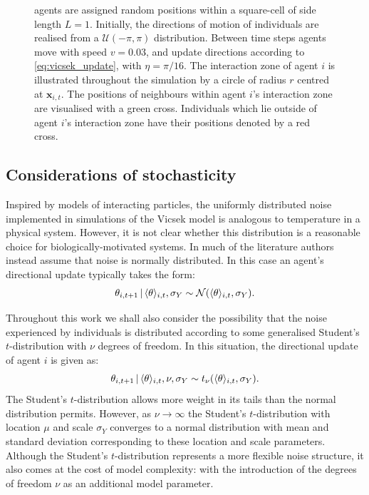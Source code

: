 \begin{figure}[tb]
{        agents are assigned random positions within a square-cell of side length $L=1$.
        Initially, the directions of motion of individuals are realised from a
        $\mathcal{U}(-\pi, \pi)$ distribution. Between time steps agents move with speed
        $v=0.03$, and update directions according to \cref{eq:vicsek_update}, with
        $\eta=\pi/16$. The interaction zone of agent $i$ is illustrated throughout the
        simulation by a circle of radius $r$ centred at $\bm{x}_{i,t}$. The positions of
        neighbours within agent $i$'s interaction zone are visualised with a green cross.
        Individuals which lie outside of agent $i$'s interaction zone have their positions
        denoted by a red cross.}
        \label{fig:vicsek_sim}
\end{figure}

\subsection{Considerations of stochasticity}

Inspired by models of interacting particles, the uniformly distributed noise implemented in
simulations of the Vicsek model is analogous to temperature in a physical system. However,
it is not clear whether this distribution is a reasonable choice for biologically-motivated
systems. In much of the literature authors instead assume that noise is normally
distributed. In this case an agent's directional update typically takes the form:
\begin{equation*}
    \theta_{i,t+1} \,|\, \langle\theta\rangle_{i,t}, \sigma_Y \sim
        \mathcal{N}(\langle\theta\rangle_{i,t}, \sigma_Y).
\end{equation*}

Throughout this work we shall also consider the possibility that the noise experienced by
individuals is distributed according to some generalised Student's $t$-distribution with
$\nu$ degrees of freedom. In this situation, the directional update of agent $i$ is given
as:
\begin{equation*}
    \theta_{i,t+1} \,|\, \langle\theta\rangle_{i,t}, \nu, \sigma_Y \sim
    t_{\nu}(\langle\theta\rangle_{i,t}, \sigma_Y).
\end{equation*}
The Student's $t$-distribution allows more weight in its tails than the normal
distribution permits. However, as $\nu\rightarrow\infty$ the Student's $t$-distribution
with location $\mu$ and scale $\sigma_Y$ converges to a normal distribution with mean and
standard deviation corresponding to these location and scale parameters.  Although the
Student's $t$-distribution represents a more flexible noise structure, it also comes at
the cost of model complexity: with the introduction of the degrees of freedom $\nu$ as an
additional model parameter.

